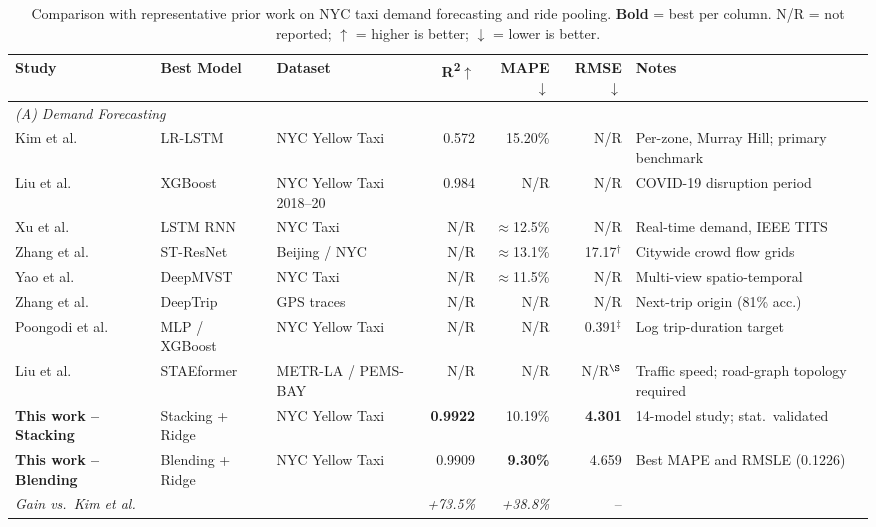 \documentclass[a4paper,fleqn]{cas-dc}
\begin{document}
\begin{table}[t]
\centering
\caption{Comparison with representative prior work on NYC taxi demand forecasting and ride pooling.
  \textbf{Bold} = best per column.
  N/R = not reported; $\uparrow$ = higher is better; $\downarrow$ = lower is better.
  \label{tab:sota}}
\begin{threeparttable}
\small
\begin{tabular}{@{}p{2.6cm}p{2.0cm}p{2.2cm}rrrp{2.8cm}@{}}
\toprule
\textbf{Study} & \textbf{Best Model} & \textbf{Dataset} &
  \textbf{R\textsuperscript{2}$\uparrow$} & \textbf{MAPE$\downarrow$} &
  \textbf{RMSE$\downarrow$} & \textbf{Notes} \\
\toprule
\multicolumn{7}{l}{\textit{(A) Demand Forecasting}} \\[2pt]
Kim et al.~\cite{kim2020hybrid} & LR-LSTM & NYC Yellow Taxi & 0.572 & 15.20\% & N/R & Per-zone, Murray Hill; primary benchmark \\
Liu et al.~\cite{liu2021epidemic} & XGBoost & NYC Yellow Taxi 2018--20 & 0.984 & N/R & N/R & COVID-19 disruption period \\
Xu et al.~\cite{xu2017realtime} & LSTM RNN & NYC Taxi & N/R & $\approx$12.5\% & N/R & Real-time demand, IEEE TITS \\
Zhang et al.~\cite{zhang2017deep} & ST-ResNet & Beijing / NYC & N/R & $\approx$13.1\% & 17.17$^{\dagger}$ & Citywide crowd flow grids \\
Yao et al.~\cite{yao2018deeptraffic} & DeepMVST & NYC Taxi & N/R & $\approx$11.5\% & N/R & Multi-view spatio-temporal \\
Zhang et al.~\cite{zhang2023deeptrip} & DeepTrip & GPS traces & N/R & N/R & N/R & Next-trip origin (81\% acc.) \\
Poongodi et al.~\cite{poongodi2022nyc} & MLP / XGBoost & NYC Yellow Taxi & N/R & N/R & 0.391$^{\ddagger}$ & Log trip-duration target \\
Liu et al.~\cite{liu2023staeformer} & STAEformer & METR-LA / PEMS-BAY & N/R & N/R & N/R$^{\S}$ & Traffic speed; road-graph topology required \\
\textbf{This work -- Stacking} & Stacking + Ridge & NYC Yellow Taxi & \textbf{0.9922} & 10.19\% & \textbf{4.301} & 14-model study; stat.\ validated \\
\textbf{This work -- Blending} & Blending + Ridge & NYC Yellow Taxi & 0.9909 & \textbf{9.30\%} & 4.659 & Best MAPE and RMSLE (0.1226) \\
\textit{Gain vs.~Kim et al.} & & & \textit{+73.5\%} & \textit{+38.8\%} & -- & \\

\end{tabular}
\end{threeparttable}
\end{table}
\end{document}

